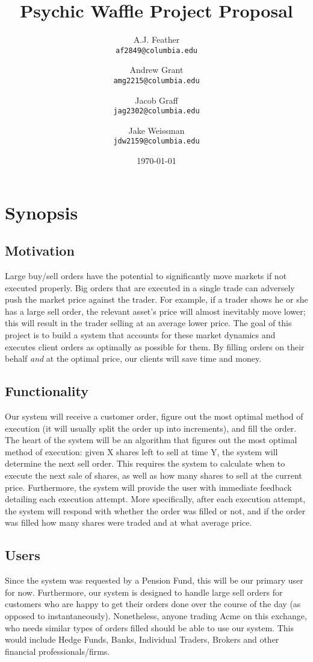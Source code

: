 \documentclass{article}
\title{Psychic Waffle Project Proposal}
\author{
    A.J. Feather\\
    \texttt{af2849@columbia.edu}
    \and
    Andrew Grant\\
    \texttt{amg2215@columbia.edu}
    \and
    Jacob Graff\\
    \texttt{jag2302@columbia.edu}
    \and
    Jake Weissman\\
    \texttt{jdw2159@columbia.edu}
}
\date{\today}
\begin{document}
\maketitle

\section{Synopsis}

\subsection{Motivation}
Large buy/sell orders have the potential to significantly move markets if not executed properly. Big orders that are executed in a single trade can adversely push the market price against the trader. For example, if a trader shows he or she has a large sell order, the relevant asset's price will almost inevitably move lower; this will result in the trader selling at an average lower price. The goal of this project is to build a system that accounts for these market dynamics and executes client orders as optimally as possible for them. By filling orders on their behalf \emph{and} at the optimal price, our clients will save time and money. 

\subsection{Functionality} %
Our system will receive a customer order, figure out the most optimal method of execution (it will usually split the order up into increments), and fill the order. The heart of the system will be an algorithm that figures out the most optimal method of execution: given X shares left to sell at time Y, the system will determine the next sell order. This requires the system to calculate when to execute the next sale of shares, as well as how many shares to sell at the current price. Furthermore, the system will provide the user with immediate feedback detailing each execution attempt. More specifically, after each execution attempt, the system will respond with whether the order was filled or not, and if the order was filled how many shares were traded and at what average price. 

\subsection{Users}
Since the system was requested by a Pension Fund, this will be our primary user for now. Furthermore, our system is designed to handle large sell orders for customers who are happy to get their orders done over the course of the day (as opposed to instantaneously). Nonetheless, anyone trading Acme on this exchange, who needs similar types of orders filled should be able to use our system. This would include Hedge Funds, Banks, Individual Traders, Brokers and other financial professionals/firms. 
\end{document}
